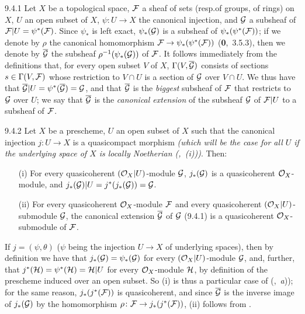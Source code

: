 \documentclass[../main.tex]{subfiles}
\begin{document}
\begin{env}{9.4.1}
Let $X$ be a topological space, $\mathcal{F}$ a
sheaf of sets (resp.of groups, of rings) on $X$, $U$ an open subset of $X$,
$\psi\colon U\to X$ the canonical injection, and $\mathcal{G}$ a subsheaf of
$\mathcal{F}|U=\psi^\ast(\mathcal{F})$. Since $\psi_\ast$ is left exact,
$\psi_\ast(\mathcal{G})$ is a subsheaf of $\psi_\ast(\psi^\ast(\mathcal{F}))$; if we denote
by $\rho$ the canonical homomorphism $\mathcal{F}\to\psi_\ast(\psi^\ast(\mathcal{F}))$
(\textbf{0},~3.5.3), then we denote by $\overline{\mathcal{G}}$ the subsheaf
$\rho^{-1}(\psi_\ast(\mathcal{G}))$ of $\mathcal{F}$. It follows immediately from the
definitions that, for every open subset $V$ of $X$,
$\Gamma(V,\overline{\mathcal{G}})$ consists of sections $s\in\Gamma(V,\mathcal{F})$
whose restriction to $V\cap U$ is a section of $\mathcal{G}$ over $V\cap U$. We
thus have that $\overline{\mathcal{G}}|U=\psi^\ast(\overline{\mathcal{G}})=\mathcal{G}$,
and that $\overline{\mathcal{G}}$ is the \emph{biggest} subsheaf of $\mathcal{F}$
that restricts to $\mathcal{G}$ over $U$; we say that $\overline{\mathcal{G}}$ is
the \emph{canonical extension} of the subsheaf $\mathcal{G}$ of $\mathcal{F}|U$ to a
subsheaf of $\mathcal{F}$.
\end{env}

\begin{env}[Proposition]{9.4.2}
Let $X$ be a prescheme, $U$ an open subset of $X$ such that the canonical injection
$j\colon U\to X$ is a quasicompact morphism \emph{(which will be the case for
\emph{all} $U$ if the underlying space of $X$ is \emph{locally Noetherian}
{\normalfont(,~(i))})}. Then:
\begin{itemize}
  \item[(i)] For every quasicoherent $(\mathcal{O}_X|U)$-module $\mathcal{G}$, $j_\ast(\mathcal{G})$
             is a quasicoherent $\mathcal{O}_X$-module, and
             $j_\ast(\mathcal{G})|U=j^\ast(j_\ast(\mathcal{G}))=\mathcal{G}$.
  \item[(ii)] For every quasicoherent $\mathcal{O}_X$-module $\mathcal{F}$ and every quasicoherent
              $(\mathcal{O}_X|U)$-submodule $\mathcal{G}$, the canonical extension
              $\overline{\mathcal{G}}$ of $\mathcal{G}$ {\normalfont(9.4.1)} is a
              quasicoherent $\mathcal{O}_X$-submodule of $\mathcal{F}$.
\end{itemize}
\end{env}

If $j=(\psi,\theta)$ ($\psi$ being the injection $U\to X$ of underlying spaces),
then by definition we have that $j_\ast(\mathcal{G})=\psi_\ast(\mathcal{G})$ for every
$(\mathcal{O}_X|U)$-module $\mathcal{G}$, and, further, that
$j^\ast(\mathcal{H})=\psi^\ast(\mathcal{H})=\mathcal{H}|U$ for every $\mathcal{O}_X$-module
$\mathcal{H}$, by definition of the prescheme induced over an open subset. So (i)
is thus a particular case of (,~\emph{a})); for the same reason,
$j_\ast(j^\ast(\mathcal{F}))$ is quasicoherent, and since $\overline{\mathcal{G}}$ is the
inverse image of $j_\ast(\mathcal{G})$ by the homomorphism $\rho\colon\mathcal{F}\to
j_\ast(j^\ast(\mathcal{F}))$, (ii) follows from .
 
\end{document}
